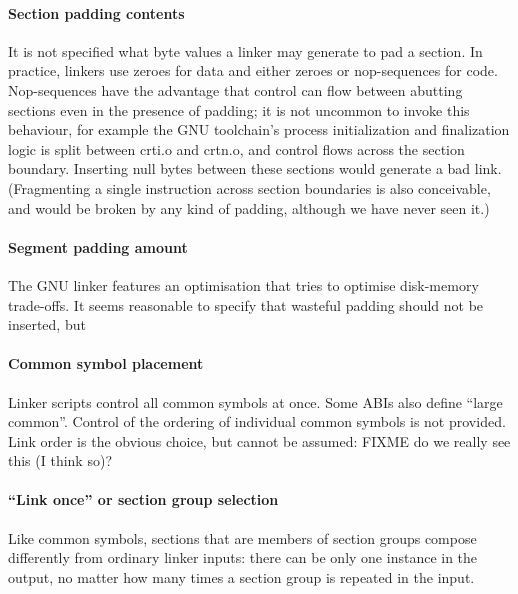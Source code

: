 \paragraph{Section padding contents}
It is not specified what byte values a linker may generate
to pad a section.
In practice, linkers use zeroes for data and either zeroes or nop-sequences for code.
Nop-sequences have the advantage that control can flow between abutting sections
even in the presence of padding; 
it is not uncommon to invoke this behaviour, 
for example 
the GNU toolchain's process initialization and finalization logic 
is split between \textsf{crti.o} and \textsf{crtn.o},
and control flows across the section boundary.
Inserting null bytes between these sections would generate a bad link.
(Fragmenting a single instruction across section boundaries
is also conceivable, and would be broken by any kind of padding, 
although we have never seen it.)


\paragraph{Segment padding amount} 
The GNU linker features an optimisation
that tries to optimise disk-memory trade-offs.
It seems reasonable to specify that 
wasteful padding should not be inserted, but 


\paragraph{Common symbol placement}
Linker scripts control all common symbols at once.
Some ABIs also define ``large common''.
Control of the ordering of individual common symbols
is not provided.
Link order is the obvious choice, but cannot be assumed: FIXME do we really see this (I think so)?

\paragraph{``Link once'' or section group selection}
Like common symbols, 
sections that are members of section groups compose differently
from ordinary linker inputs:
there can be only one instance in the output, no matter how many times
a section group is repeated in the input.

